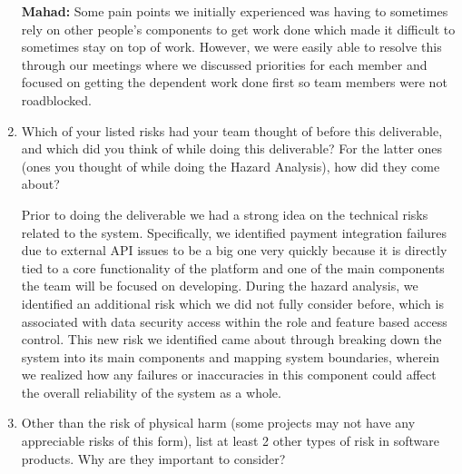 \documentclass{article}
\begin{document}
\begin{enumerate}
    \textbf{Mahad:} Some pain points we initially experienced was having to sometimes rely on other people's components to get work done which made it difficult to sometimes stay on top of work. However, we were easily able to resolve this through our meetings where we discussed priorities for each member and focused on getting the dependent work done first so team members were not roadblocked.


    \item Which of your listed risks had your team thought of before this
    deliverable, and which did you think of while doing this deliverable? For
    the latter ones (ones you thought of while doing the Hazard Analysis), how
    did they come about?

    Prior to doing the deliverable we had a strong idea on the technical risks related to the system. Specifically, we identified payment integration failures due to external API issues to be a big one very quickly because it is directly tied to a core functionality of the platform and one of the main components the team will be focused on developing. During the hazard analysis, we identified an additional risk which we did not fully consider before, which is associated with data security access within the role and feature based access control. This new risk we identified came about through breaking down the system into its main components and mapping system boundaries, wherein we realized how any failures or inaccuracies in this component could affect the overall reliability of the system as a whole.


    \item Other than the risk of physical harm (some projects may not have any
    appreciable risks of this form), list at least 2 other types of risk in
    software products. Why are they important to consider?
    

\end{enumerate}
\end{document}
